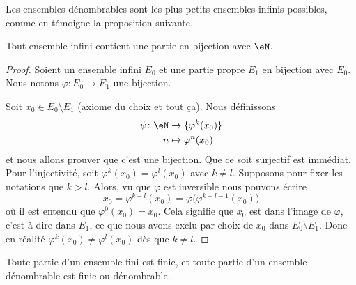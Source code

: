 Les ensembles dénombrables sont les plus petits ensembles infinis possibles, comme en témoigne la proposition suivante.
\begin{proposition}      \label{PROPooUIPAooCUEFme}
	Tout ensemble infini contient une partie en bijection avec \( \eN\).
\end{proposition}

\begin{proof}
	Soient un ensemble infini \( E_0\) et une partie propre \( E_1\) en bijection avec \( E_0\). Nous notons \( \varphi\colon E_0\to E_1\) une bijection.

	Soit \( x_0\in E_0\setminus E_1\) (axiome du choix et tout ça). Nous définissons
	\begin{equation}
		\begin{aligned}
			\psi\colon \eN & \to \{\varphi^k(x_0)\} \\
			n              & \mapsto \varphi^n(x_0)
		\end{aligned}
	\end{equation}
	et nous allons prouver que c'est une bijection. Que ce soit surjectif est immédiat. Pour l'injectivité, soit \( \varphi^k(x_0)=\varphi^l(x_0)\) avec \( k\neq l\). Supposons pour fixer les notations que \( k>l\). Alors, vu que \( \varphi\) est inversible nous pouvons écrire
	\begin{equation}
		x_0=\varphi^{k-l}(x_0)=\varphi\big( \varphi^{k-l-1}(x_0) \big)
	\end{equation}
	où il est entendu que \( \varphi^0(x_0)=x_0\). Cela signifie que \( x_0\) est dans l'image de \( \varphi\), c'est-à-dire dans \( E_1\), ce que nous avons exclu par choix de \( x_0\) dans \( E_0\setminus E_1\). Donc en réalité \( \varphi^k(x_0)\neq \varphi^l(x_0)\) dès que \( k\neq l\).
\end{proof}

\begin{proposition} \label{PropQEPoozLqOQ}
	Toute partie d'un ensemble fini est finie, et toute partie d'un ensemble dénombrable est finie ou dénombrable.
\end{proposition}

